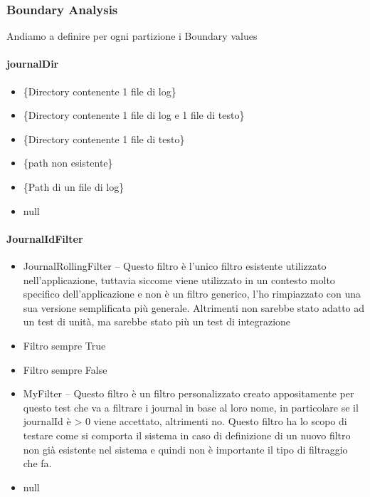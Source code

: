 \documentclass[12pt, a4paper]{article}
\begin{document}
\subsubsection{Boundary Analysis}
Andiamo a definire per ogni partizione i Boundary values

\paragraph{journalDir}
\begin{itemize}
  \item \{Directory contenente 1 file di log\}
  \item \{Directory contenente 1 file di log e 1 file di testo\}
  \item \{Directory contenente 1 file di testo\}
  \item \{path non esistente\}
  \item \{Path di un file di log\}
  \item null
\end{itemize}

\paragraph{JournalIdFilter}
\begin{itemize}
    \item JournalRollingFilter  -- Questo filtro è l'unico filtro esistente utilizzato nell'applicazione, 
    tuttavia siccome viene utilizzato in un contesto molto specifico dell'applicazione e non è un filtro generico, l'ho rimpiazzato
    con una sua versione semplificata più generale. Altrimenti non sarebbe stato adatto ad un test di unità, ma sarebbe stato 
    più un test di integrazione
    \item Filtro sempre True
    \item Filtro sempre False
    \item MyFilter -- Questo filtro è un filtro personalizzato creato appositamente per questo test che va a filtrare i journal
    in base al loro nome, in particolare se il journalId è > 0 viene accettato, altrimenti no. 
    Questo filtro ha lo scopo di testare come si comporta il sistema in caso di definizione di un nuovo filtro non già esistente 
    nel sistema e quindi non è importante il tipo di filtraggio che fa.
    \item null
\end{itemize}

\paragraph{}
\end{document}
